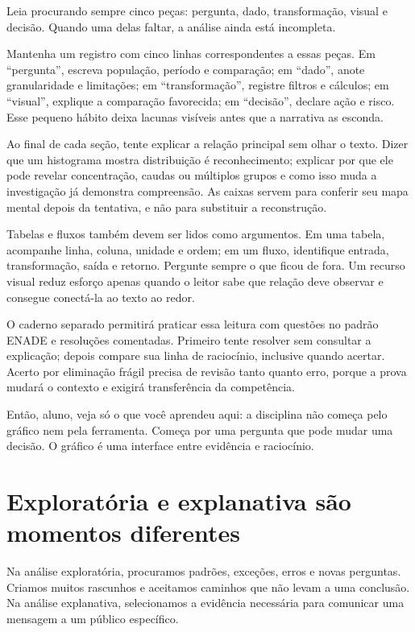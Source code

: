Leia procurando sempre cinco peças: pergunta, dado, transformação, visual e decisão. Quando uma delas faltar, a análise ainda está incompleta.

Mantenha um registro com cinco linhas correspondentes a essas peças. Em ``pergunta'', escreva população, período e comparação; em ``dado'', anote granularidade e limitações; em ``transformação'', registre filtros e cálculos; em ``visual'', explique a comparação favorecida; em ``decisão'', declare ação e risco. Esse pequeno hábito deixa lacunas visíveis antes que a narrativa as esconda.

Ao final de cada seção, tente explicar a relação principal sem olhar o texto. Dizer que um histograma mostra distribuição é reconhecimento; explicar por que ele pode revelar concentração, caudas ou múltiplos grupos e como isso muda a investigação já demonstra compreensão. As caixas servem para conferir seu mapa mental depois da tentativa, e não para substituir a reconstrução.

Tabelas e fluxos também devem ser lidos como argumentos. Em uma tabela, acompanhe linha, coluna, unidade e ordem; em um fluxo, identifique entrada, transformação, saída e retorno. Pergunte sempre o que ficou de fora. Um recurso visual reduz esforço apenas quando o leitor sabe que relação deve observar e consegue conectá-la ao texto ao redor.

O caderno separado permitirá praticar essa leitura com questões no padrão ENADE e resoluções comentadas. Primeiro tente resolver sem consultar a explicação; depois compare sua linha de raciocínio, inclusive quando acertar. Acerto por eliminação frágil precisa de revisão tanto quanto erro, porque a prova mudará o contexto e exigirá transferência da competência.

\begin{SummaryBox}
Então, aluno, veja só o que você aprendeu aqui: a disciplina não começa pelo gráfico nem pela ferramenta. Começa por uma pergunta que pode mudar uma decisão. O gráfico é uma interface entre evidência e raciocínio.
\end{SummaryBox}

\section{Exploratória e explanativa são momentos diferentes}

Na análise exploratória, procuramos padrões, exceções, erros e novas perguntas. Criamos muitos rascunhos e aceitamos caminhos que não levam a uma conclusão. Na análise explanativa, selecionamos a evidência necessária para comunicar uma mensagem a um público específico.

